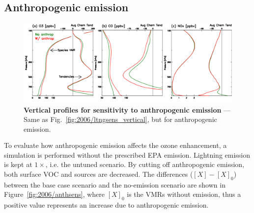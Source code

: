 \subsection{Anthropogenic emission}\label{ssec:2006/sens/anthrop}

	\begin{figure}[t!]
		\centering
		\includegraphics[width=1.0\textwidth]{sens/anthsens_vert}
		\caption[Vertical profiles for sensitivity to anthropogenic emission]{\textbf{Vertical profiles for sensitivity to
		anthropogenic emission} --- Same as Fig.~\ref{fig:2006/ltngsens_vertical}, but for anthropogenic emission.
		\label{fig:2006/anthsens_vert} }\vspace{-.3in}
	\end{figure}

To evaluate how anthropogenic emission affects the ozone enhancement, a simulation is performed without the prescribed
EPA emission. Lightning emission is kept at $1\times$, i.e. the untuned scenario. By cutting off anthropogenic emission, both
surface VOC and  sources are decreased. The differences ($[X]-[X]_0$) between the base case scenario and
the no-emission scenario are shown in Figure~\ref{fig:2006/anthsens}, where $[X]_0$ is the VMRs without emission, thus
a positive value represents an increase due to anthropogenic emission.


